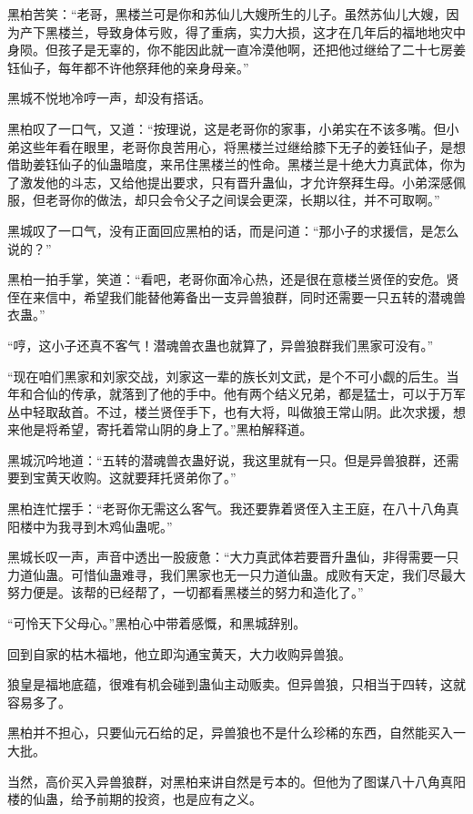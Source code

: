 \begin{this_body}
黑柏苦笑：“老哥，黑楼兰可是你和苏仙儿大嫂所生的儿子。虽然苏仙儿大嫂，因为产下黑楼兰，导致身体亏败，得了重病，实力大损，这才在几年后的福地地灾中身陨。但孩子是无辜的，你不能因此就一直冷漠他啊，还把他过继给了二十七房姜钰仙子，每年都不许他祭拜他的亲身母亲。”

黑城不悦地冷哼一声，却没有搭话。

黑柏叹了一口气，又道：“按理说，这是老哥你的家事，小弟实在不该多嘴。但小弟这些年看在眼里，老哥你良苦用心，将黑楼兰过继给膝下无子的姜钰仙子，是想借助姜钰仙子的仙蛊暗度，来吊住黑楼兰的性命。黑楼兰是十绝大力真武体，你为了激发他的斗志，又给他提出要求，只有晋升蛊仙，才允许祭拜生母。小弟深感佩服，但老哥你的做法，却只会令父子之间误会更深，长期以往，并不可取啊。”

黑城叹了一口气，没有正面回应黑柏的话，而是问道：“那小子的求援信，是怎么说的？”

黑柏一拍手掌，笑道：“看吧，老哥你面冷心热，还是很在意楼兰贤侄的安危。贤侄在来信中，希望我们能替他筹备出一支异兽狼群，同时还需要一只五转的潜魂兽衣蛊。”

“哼，这小子还真不客气！潜魂兽衣蛊也就算了，异兽狼群我们黑家可没有。”

“现在咱们黑家和刘家交战，刘家这一辈的族长刘文武，是个不可小觑的后生。当年和合仙的传承，就落到了他的手中。他有两个结义兄弟，都是猛士，可以于万军丛中轻取敌首。不过，楼兰贤侄手下，也有大将，叫做狼王常山阴。此次求援，想来他是将希望，寄托着常山阴的身上了。”黑柏解释道。

黑城沉吟地道：“五转的潜魂兽衣蛊好说，我这里就有一只。但是异兽狼群，还需要到宝黄天收购。这就要拜托贤弟你了。”

黑柏连忙摆手：“老哥你无需这么客气。我还要靠着贤侄入主王庭，在八十八角真阳楼中为我寻到木鸡仙蛊呢。”

黑城长叹一声，声音中透出一股疲惫：“大力真武体若要晋升蛊仙，非得需要一只力道仙蛊。可惜仙蛊难寻，我们黑家也无一只力道仙蛊。成败有天定，我们尽最大努力便是。该帮的已经帮了，一切都看黑楼兰的努力和造化了。”

“可怜天下父母心。”黑柏心中带着感慨，和黑城辞别。

回到自家的枯木福地，他立即沟通宝黄天，大力收购异兽狼。

狼皇是福地底蕴，很难有机会碰到蛊仙主动贩卖。但异兽狼，只相当于四转，这就容易多了。

黑柏并不担心，只要仙元石给的足，异兽狼也不是什么珍稀的东西，自然能买入一大批。

当然，高价买入异兽狼群，对黑柏来讲自然是亏本的。但他为了图谋八十八角真阳楼的仙蛊，给予前期的投资，也是应有之义。


\end{this_body}

